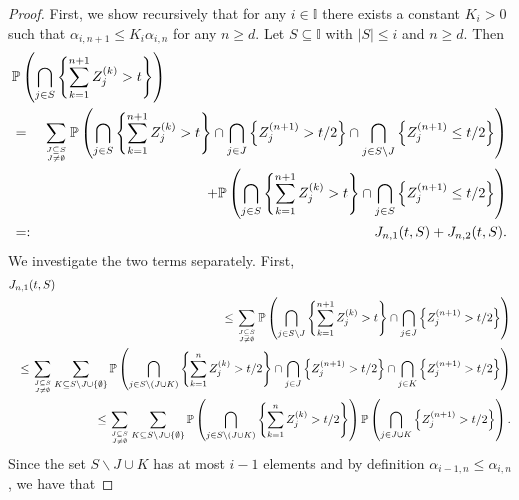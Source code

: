 \documentclass[aos]{imsart}
\numberwithin{equation}{section}
\theoremstyle{plain} %
\theoremstyle{remark}
\newcommand{\beao}{\begin{eqnarray*}}
\newcommand{\eeao}{\end{eqnarray*}\noindent}
\newcommand{\beam}{\begin{eqnarray}}
\newcommand{\eeam}{\end{eqnarray}\noindent}
\newcommand{\N}{\mathbb{N}}
\renewcommand\P{\mathbb{P}}
\begin{document}
\begin{proof}
    First, we show recursively that for any $i\in\mathbb{I}$ there exists a constant $K_i>0$
    such that $\alpha_{i,n+1}\leq K_i\alpha_{i,n}$ for any $n\geq d$.
    Let $S\subseteq \mathbb{I}$ with $|S|\leq i$ and $n\geq d$. Then
    \beam \label{E1}
        \lefteqn{\P\left(\bigcap_{j\in S}\left\{\sum_{k=1}^{n+1} Z^{(k)}_j>t\right\}\right)} \nonumber\\
            &=&\sum_{\genfrac{}{}{0pt}{}{J\subseteq S}{J\not=\emptyset} }
            \P\left(\bigcap_{j\in S}\left\{\sum_{k=1}^{n+1} Z^{(k)}_j>t\right\}\cap
                \bigcap_{j\in J}\left\{ Z^{(n+1)}_j>t/2\right\}\cap
                \bigcap_{j\in S\backslash J}\left\{ Z^{(n+1)}_j\leq t/2\right\}\right)\nonumber \\
            &&+\P\left(\bigcap_{j\in S}\left\{\sum_{k=1}^{n+1} Z^{(k)}_j>t\right\}\cap
                \bigcap_{j\in S}\left\{ Z^{(n+1)}_j\leq t/2\right\}\right) \nonumber\\
            &=:&J_{n,1}(t,S)+J_{n,2}(t,S).
            \eeam
    We investigate the two terms separately. First,
    \beao
        \lefteqn{J_{n,1}(t,S)}\\
            &&\leq \sum_{\genfrac{}{}{0pt}{}{J\subseteq S}{J\not=\emptyset} }
            \P\left(\bigcap_{j\in S\backslash J}\left\{\sum_{k=1}^{n+1} Z^{(k)}_j>t\right\}\cap
                \bigcap_{j\in J}\left\{ Z^{(n+1)}_j>t/2\right\}\right)\\
            &&\leq \sum_{\genfrac{}{}{0pt}{}{J\subseteq S}{J\not=\emptyset} }\sum_{K\subseteq S\backslash J \cup\{\emptyset\}}
            \P\left(\bigcap_{j\in S\backslash (J\cup K) }\left\{\sum_{k=1}^{n} Z^{(k)}_j>t/2\right\}\cap
                \bigcap_{j\in J}\left\{ Z^{(n+1)}_j>t/2\right\}\cap \bigcap_{j\in K}\left\{ Z^{(n+1)}_j>t/2\right\}\right)\\
            &&\leq \sum_{\genfrac{}{}{0pt}{}{J\subseteq S}{J\not=\emptyset} }\sum_{K\subseteq S\backslash J\cup\{\emptyset\}}
            \P\left(\bigcap_{j\in S\backslash (J\cup K)}\left\{\sum_{k=1}^{n} Z^{(k)}_j>t/2\right\}\right)
                \P\left(\bigcap_{j\in J\cup K}\left\{ Z^{(n+1)}_j>t/2\right\}\right).
    \eeao
    Since the set $S\backslash J\cup K$ has at most $i-1$ elements and by definition $\alpha_{i-1,n}\leq \alpha_{i,n}$, we have that


\end{proof}
\end{document}
